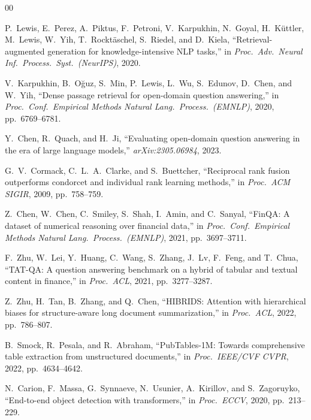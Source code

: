 \documentclass[conference]{IEEEtran}
\begin{document}
\begin{thebibliography}{00}

P.~Lewis, E.~Perez, A.~Piktus, F.~Petroni, V.~Karpukhin, N.~Goyal, H.~K\"{u}ttler,
M.~Lewis, W.~Yih, T.~Rockt\"{a}schel, S.~Riedel, and D.~Kiela,
``Retrieval-augmented generation for knowledge-intensive NLP tasks,''
in \textit{Proc.\ Adv.\ Neural Inf.\ Process.\ Syst.\ (NeurIPS)}, 2020.

V.~Karpukhin, B.~O\u{g}uz, S.~Min, P.~Lewis, L.~Wu, S.~Edunov, D.~Chen,
and W.~Yih,
``Dense passage retrieval for open-domain question answering,''
in \textit{Proc.\ Conf.\ Empirical Methods Natural Lang.\ Process.\ (EMNLP)},
2020, pp.~6769--6781.

Y.~Chen, R.~Quach, and H.~Ji,
``Evaluating open-domain question answering in the era of large language models,''
\textit{arXiv:2305.06984}, 2023.

G.~V.~Cormack, C.~L.~A.~Clarke, and S.~Buettcher,
``Reciprocal rank fusion outperforms condorcet and individual rank learning methods,''
in \textit{Proc.\ ACM SIGIR}, 2009, pp.~758--759.

Z.~Chen, W.~Chen, C.~Smiley, S.~Shah, I.~Amin, and C.~Sanyal,
``FinQA: A dataset of numerical reasoning over financial data,''
in \textit{Proc.\ Conf.\ Empirical Methods Natural Lang.\ Process.\ (EMNLP)},
2021, pp.~3697--3711.

F.~Zhu, W.~Lei, Y.~Huang, C.~Wang, S.~Zhang, J.~Lv, F.~Feng, and T.~Chua,
``TAT-QA: A question answering benchmark on a hybrid of tabular and textual content
in finance,'' in \textit{Proc.\ ACL}, 2021, pp.~3277--3287.

Z.~Zhu, H.~Tan, B.~Zhang, and Q.~Chen,
``HIBRIDS: Attention with hierarchical biases for structure-aware long
document summarization,''
in \textit{Proc.\ ACL}, 2022, pp.~786--807.

B.~Smock, R.~Pesala, and R.~Abraham,
``PubTables-1M: Towards comprehensive table extraction from unstructured
documents,'' in \textit{Proc.\ IEEE/CVF CVPR}, 2022, pp.~4634--4642.

N.~Carion, F.~Massa, G.~Synnaeve, N.~Usunier, A.~Kirillov, and S.~Zagoruyko,
``End-to-end object detection with transformers,''
in \textit{Proc.\ ECCV}, 2020, pp.~213--229.


\end{thebibliography}
\end{document}
